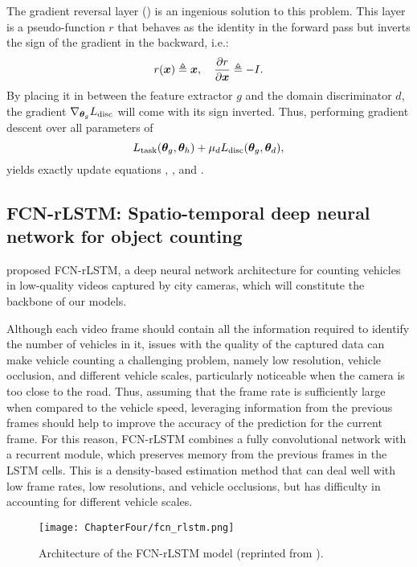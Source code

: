 The gradient reversal layer (\citet{Ganin2015}) is an ingenious solution to this problem. This layer is a pseudo-function $r$ that behaves as the identity in the forward pass but inverts the sign of the gradient in the backward, i.e.:
\begin{equation}
    r({\bm{x}}) \triangleq {\bm{x}}, \quad \frac{\partial r}{\partial {\bm{x}}} \triangleq -I.
\end{equation}
By placing it in between the feature extractor $g$ and the domain discriminator $d$, the gradient $\nabla_{{\bm{\theta}}_g} L_{\text{disc}}$ will come with its sign inverted. Thus, performing gradient descent over all parameters of
\begin{equation}
    L_{\text{task}}({\bm{\theta}}_g, {\bm{\theta}}_h) + \mu_d L_{\text{disc}}({\bm{\theta}}_g, {\bm{\theta}}_d),
\end{equation}
yields exactly update equations , , and .

\subsection{FCN-rLSTM: Spatio-temporal deep neural network for object counting}
\label{sec:da_sensors_fcn_rltsm}

\citet{Zhang2017} proposed FCN-rLSTM, a deep neural network architecture for counting vehicles in low-quality videos captured by city cameras, which will constitute the backbone of our models.

Although each video frame should contain all the information required to identify the number of vehicles in it, issues with the quality of the captured data can make vehicle counting a challenging problem, namely low resolution, vehicle occlusion, and different vehicle scales, particularly noticeable when the camera is too close to the road. Thus, assuming that the frame rate is sufficiently large when compared to the vehicle speed, leveraging information from the previous frames should help to improve the accuracy of the prediction for the current frame. For this reason, FCN-rLSTM combines a fully convolutional network with a recurrent module, which preserves memory from the previous frames in the LSTM cells. This is a density-based estimation method that can deal well with low frame rates, low resolutions, and vehicle occlusions, but has difficulty in accounting for different vehicle scales.

\begin{figure}
    \centering
    \texttt{[image: ChapterFour/fcn\_rlstm.png]}
    \caption{Architecture of the FCN-rLSTM model (reprinted from \citet{Zhang2017}).}
    \label{fig:fcn_rlstm}
\end{figure}

